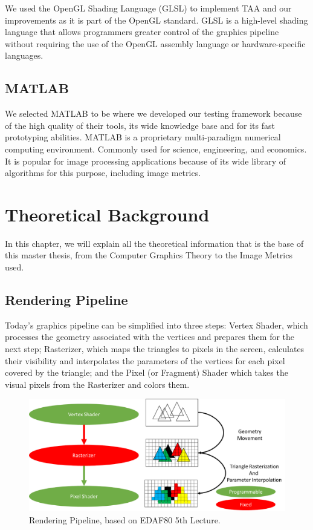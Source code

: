\documentclass{cslthse-msc}
\begin{document}
We used the OpenGL Shading Language (GLSL) to implement TAA and our improvements as it is part of the OpenGL standard. GLSL is a high-level shading language that allows programmers greater control of the graphics pipeline without requiring the use of the OpenGL assembly language or hardware-specific languages.

\section{MATLAB}
We selected MATLAB to be where we developed our testing framework because of the high quality of their tools, its wide knowledge base and for its fast prototyping abilities.
MATLAB is a proprietary multi-paradigm numerical computing environment. Commonly used for science, engineering, and economics. It is popular for image processing applications because of its wide library of algorithms for this purpose, including image metrics. 

\chapter{Theoretical Background}
In this chapter, we will explain all the theoretical information that is the base of this master thesis, from the Computer Graphics Theory to the Image Metrics used.

\section{Rendering Pipeline}
Today’s graphics pipeline can be simplified into three steps: Vertex Shader, which processes the geometry associated with the vertices and prepares them for the next step; Rasterizer, which maps the triangles to pixels in the screen, calculates their visibility and interpolates the parameters of the vertices for each pixel covered by the triangle; and the Pixel (or Fragment) Shader which takes the visual pixels from the Rasterizer and colors them.

\begin{figure}[!hbt]
	\centering
	\includegraphics[scale=0.7]{images/graphics_pipeline.png} 
	\caption{Rendering Pipeline, based on EDAF80 5th Lecture.~\cite{Doggett2017EDAF80}}\label{fig:graphpipeline}
\end{figure}
\end{document}
